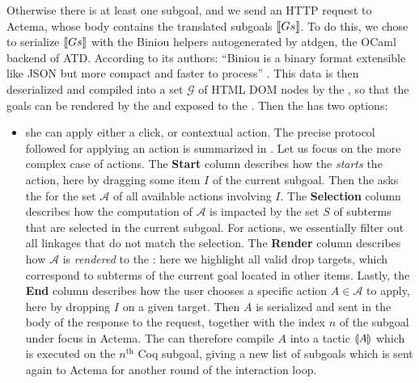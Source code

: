 Otherwise there is at least one subgoal, and we send an  HTTP
request to Actema, whose body contains the translated subgoals $\llbracket Gs \rrbracket$. To
do this, we chose to serialize $\llbracket Gs \rrbracket$ with the Biniou helpers
autogenerated by atdgen, the OCaml backend of ATD. According to its authors:
``Biniou is a binary format extensible like JSON but more compact and faster to
process'' . This data is then deserialized and compiled into a
set $\mathcal{G}$ of HTML DOM nodes by the , so that the goals
can be rendered by the  and exposed to the .
Then the  has two options:
\begin{itemize}
  \item she can apply either a click,  or contextual action. The precise protocol followed for applying an action is
  summarized in . Let us focus on the more complex case
  of  actions. The \textbf{Start} column describes how the 
  \emph{starts} the action, here by dragging some item $I$ of the current
  subgoal. Then the  asks the  for the set
  $\mathcal{A}$ of all available  actions involving $I$. The
  \textbf{Selection} column describes how the computation of $\mathcal{A}$ is
  impacted by the set $S$ of subterms that are selected in the current subgoal.
  For  actions, we essentially filter out all linkages that do not match the
  selection. The \textbf{Render} column describes how $\mathcal{A}$ is
  \emph{rendered} to the : here we highlight all valid drop
  targets, which correspond to subterms of the current goal located in other
  items. Lastly, the \textbf{End} column describes how
  the user chooses a specific action $A \in \mathcal{A}$ to apply, here by
  dropping $I$ on a given target. Then $A$ is serialized and sent in the body of
  the response to the  request, together with the index $n$ of
  the subgoal under focus in Actema. The  can therefore compile
  $A$ into a tactic $\llparenthesis A \rrparenthesis$ which is executed on the $n^{\text{th}}$ Coq
  subgoal, giving a new list of subgoals which is sent again to Actema for
  another round of the interaction loop.


\end{itemize}
